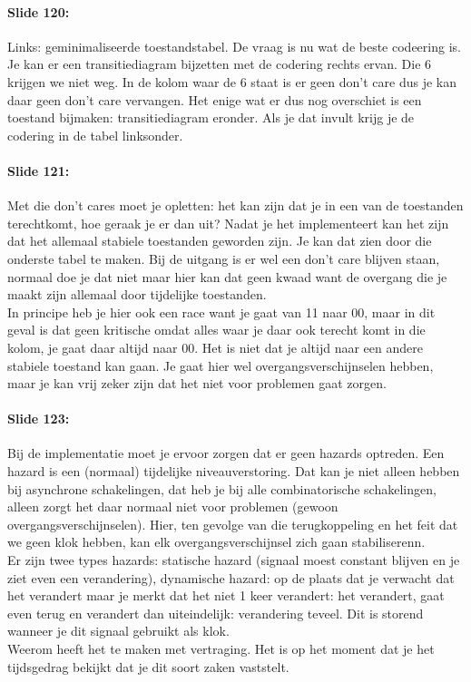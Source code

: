 \documentclass[10pt,a4paper]{book}
\begin{document}
\paragraph{Slide 120:} Links: geminimaliseerde toestandstabel. De vraag is nu wat de beste codeering is. Je kan er een transitiediagram bijzetten met de codering rechts ervan. Die 6 krijgen we niet weg. In de kolom waar de 6 staat is er geen don't care dus je kan daar geen don't care vervangen. Het enige wat er dus nog overschiet is een toestand bijmaken: transitiediagram eronder. Als je dat invult krijg je de codering in de tabel linksonder.

\paragraph{Slide 121:} Met die don't cares moet je opletten: het kan zijn dat je in een van de toestanden terechtkomt, hoe geraak je er dan uit? Nadat je het implementeert kan het zijn dat het allemaal stabiele toestanden geworden zijn.
Je kan dat zien door die onderste tabel te maken. Bij de uitgang is er wel een don't care blijven staan, normaal doe je dat niet maar hier kan dat geen kwaad want de overgang die je maakt zijn allemaal door tijdelijke toestanden.\\
In principe heb je hier ook een race want je gaat van 11 naar 00, maar in dit geval is dat geen kritische omdat alles waar je daar ook terecht komt in die kolom, je gaat daar altijd naar 00. Het is niet dat je altijd naar een andere stabiele toestand kan gaan. Je gaat hier wel overgangsverschijnselen hebben, maar je kan vrij zeker zijn dat het niet voor problemen gaat zorgen.

\paragraph{Slide 123:} Bij de implementatie moet je ervoor zorgen dat er geen hazards optreden. Een hazard is een (normaal) tijdelijke niveauverstoring. Dat kan je niet alleen hebben bij asynchrone schakelingen, dat heb je bij alle combinatorische schakelingen, alleen zorgt het daar normaal niet voor problemen (gewoon overgangsverschijnselen). Hier, ten gevolge van die terugkoppeling en het feit dat we geen klok hebben, kan elk overgangsverschijnsel zich gaan stabiliserenn.\\
Er zijn twee types hazards: statische hazard (signaal moest constant blijven en je ziet even een verandering), dynamische hazard: op de plaats dat je verwacht dat het verandert maar je merkt dat het niet 1 keer verandert: het verandert, gaat even terug en verandert dan uiteindelijk: verandering teveel. Dit is storend wanneer je dit signaal gebruikt als klok.\\
Weerom heeft het te maken met vertraging. Het is op het moment dat je het tijdsgedrag bekijkt dat je dit soort zaken vaststelt.
\end{document}
